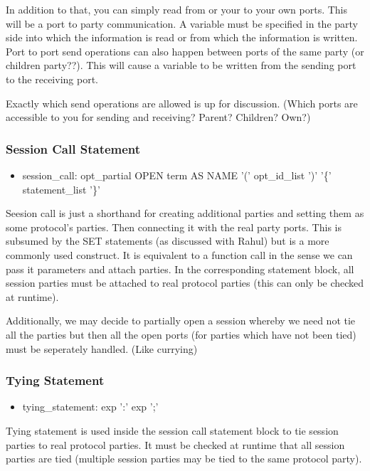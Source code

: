 In addition to that, you can simply read from or your to your own ports. This will be a port to party communication. A variable must be specified in the party side into which the information is read or from which the information is written. Port to port send operations can also happen between ports of the same party (or children party??). This will cause a variable to be written from the sending port to the receiving port.

Exactly which send operations are allowed is up for discussion. (Which ports are accessible to you for sending and receiving? Parent? Children? Own?)

\subsubsection{Session Call Statement}
\begin{itemize}
\item session\_call: opt\_partial OPEN term AS NAME '(' opt\_id\_list ')' '\{' statement\_list '\}'
\end{itemize}

Seesion call is just a shorthand for creating additional parties and setting them as some protocol's parties. Then connecting it with the real party ports. This is subsumed by the SET statements (as discussed with Rahul) but is a more commonly used construct. It is equivalent to a function call in the sense we can pass it parameters and attach parties. In the corresponding statement block, all session parties must be attached to real protocol parties (this can only be checked at runtime).

Additionally, we may decide to partially open a session whereby we need not tie all the parties but then all the open ports (for parties which have not been tied) must be seperately handled. (Like currying)

\subsubsection{Tying Statement}
\begin{itemize}
\item tying\_statement: exp ':' exp ';'
\end{itemize}

Tying statement is used inside the session call statement block to tie session parties to real protocol parties. It must be checked at runtime that all session parties are tied (multiple session parties may be tied to the same protocol party).

